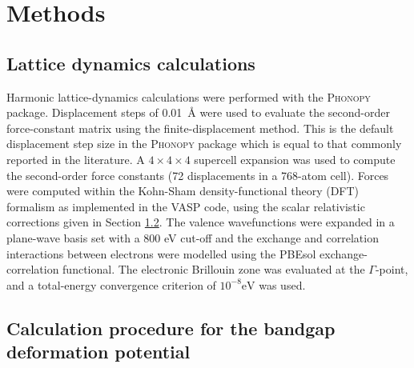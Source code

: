 

\section{Methods}

\subsection{Lattice dynamics calculations}

Harmonic lattice-dynamics calculations were performed with the \textsc{Phonopy} package.\autocite{Togo2015} Displacement steps of \SI{0.01}{\angstrom} were used to evaluate the second-order force-constant matrix using the finite-displacement method. This is the default displacement step size in the \textsc{Phonopy} package which is equal to that commonly reported in the literature.\autocite{Togo2015,Skelton2017}
A $4\! \times\! 4\! \times\! 4$ supercell expansion was used to compute the second-order force constants (72 displacements in a 768-atom cell).
Forces were computed within the Kohn-Sham density-functional theory (DFT) formalism as implemented in the \textsc{VASP} code,\autocite{Kresse1996a} using the scalar relativistic corrections given in Section \ref{bgdefmethod}.
The valence wavefunctions were expanded in a plane-wave basis set with a 800 eV cut-off and the exchange and correlation interactions between electrons were modelled using the PBEsol exchange-correlation functional.\autocite{Perdew2008a}
The electronic Brillouin zone was evaluated at the $\Gamma$-point, and a total-energy convergence criterion of $10^{-8}\textrm{eV}$ was used.

\subsection{Calculation procedure for the bandgap deformation potential} \label{bgdefmethod}

